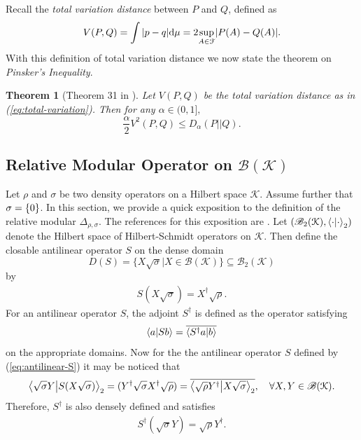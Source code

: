 \documentclass[12pt,a4paper,oneside]{article}
\numberwithin{equation}{section}
\theoremstyle{definition}  %
\theoremstyle{plain}  %
\newtheorem{thm}[defn]{Theorem}
\theoremstyle{remark} %
\newcommand{\B}[1]{\mathscr{B}({#1})}
\newcommand{\Bt}[1]{\mathscr{B}_2({#1})}
\newcommand{\CK}{\mathcal{K}}
\let\tr\relax
\DeclareMathOperator{\tr}{Tr}
\let\ker\relax
\DeclareMathOperator{\ker}{Ker}
\begin{document}
Recall the \emph{total variation distance} between $P$ and $Q$, defined as \begin{equation}\label{eq:total-variation}
    V(P,Q) = \int \abs{p-q} \dd \mu = 2\underset{A\in \mathcal{F}}{\sup} \abs{P(A)-Q(A)}.
\end{equation}
With this definition of total variation distance we now state the theorem on \emph{Pinsker's Inequality}.
\begin{thm}
[Theorem 31 in \cite{Erven-Harremos-2014}]\label{thm:31-veh}
Let $V(P,Q)$ be the total variation distance as in (\ref{eq:total-variation}). Then for any $\alpha \in (0,1],$
\begin{equation}
    \frac{\alpha}{2}V^2(P,Q) \leq D_{\alpha}(P||Q).
\end{equation}
\end{thm}
\subsection{Relative Modular Operator on \texorpdfstring{\ensuremath{\B{\CK }}}{}}\label{appendix:relative-modular}Let $\rho$ and $\sigma$ be two density operators  on a Hilbert space $\CK $. Assume further that $\ker \sigma =\{0\}$.
In this section, we provide a quick exposition to the definition of the relative modular $\Delta_{\rho,\sigma}$. The references for this exposition are \cite{araki1977relative, luczak2019relative}. Let $(\Bt{\CK }, \braket{\cdot}{\cdot}_2)$ denote the Hilbert space of Hilbert-Schmidt operators on $\CK $. Then  define the closable antilinear operator $S$ on the dense domain \[D(S)= \{X\sqrt{\sigma}|X\in \B{\CK }\}\subseteq \Bt{\CK }\]
by \begin{align}\label{eq:antilinear-S}
    S(X\sqrt{\sigma}) =X^{\dagger}\sqrt{\rho}.
\end{align}
For an antilinear operator $S$, the adjoint $S^{\dagger}$ is defined as the operator satisfying \[\braket{a}{Sb} = \overline{\braket{S^{\dagger}a}{b}}\]
on the appropriate domains. Now for the the antilinear operator $S$ defined by (\ref{eq:antilinear-S}) it may be noticed that \[\braket{\sqrt{\sigma}Y}{S(X\sqrt{\sigma})}_2 = \tr (Y^{\dagger}\sqrt{\sigma}X^{\dagger}\sqrt{\rho}) = \overline{\braket{\sqrt{\rho}Y^\dagger}{X\sqrt{\sigma}}_2}, \quad \forall X,Y\in \B{\CK }.\]
Therefore, $S^{\dagger}$ is also densely defined and satisfies 
\begin{align}\label{eq:antilinear-S-dagger}
    S^{\dagger}\left(\sqrt{\sigma}Y\right) =\sqrt{\rho}Y^{\dagger}.
\end{align}
\end{document}
